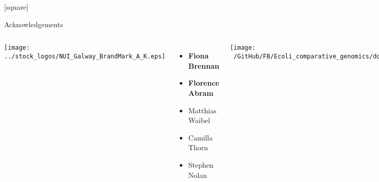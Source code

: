 \documentclass[10pt, compress]{beamer}
\begin{document}
\begin{frame}
%

\end{frame}

[square]
\begin{frame}{Acknowledgements}
  \begin{columns}[onlytextwidth]
    \texttt{[image: ../stock\_logos/NUI\_Galway\_BrandMark\_A\_K.eps]}\\
      \begin{itemize}
        \item \textbf{Fiona Brennan}
        \item \textbf{Florence Abram}
        \item Matthias Waibel
        \item Camilla Thorn
        \item Stephen Nolan
        \end{itemize}
        \vfill

    \texttt{[image: ~/GitHub/FB/Ecoli\_comparative\_genomics/doc/presentations/MyNUIG(mnuigtheme)/frequentFigs/jhi\_dark.png]}\\
      \begin{itemize}
      \item \textbf{Leighton Pritchard}
        \item \textbf{Ashleigh Holmnes}
        \end{itemize}
        \vskip 1.2cm
        \alert<2>{}
  \end{columns}
\end{frame}



\end{document}
